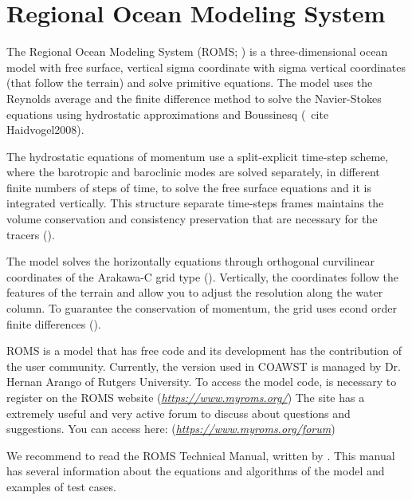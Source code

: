 
\section{Regional Ocean Modeling System}\label{romssecao}
\bigskip
\noindent The Regional Ocean Modeling System (ROMS; \cite{Shchepetkin2005}) is a three-dimensional ocean model with free surface, vertical sigma coordinate 
with sigma vertical coordinates (that follow the terrain) and solve primitive equations. The model uses the Reynolds average and the finite difference method to 
solve the Navier-Stokes equations using hydrostatic approximations and Boussinesq (\ cite {Haidvogel2008}).
\bigskip

\noindent The hydrostatic equations of momentum use a split-explicit time-step scheme, where the barotropic and baroclinic modes are solved separately, in
different finite numbers of steps of time, to solve the free surface equations and it is integrated vertically. This structure separate time-steps frames maintains 
the volume conservation and consistency preservation that are necessary for the tracers (\cite{Shchepetkin2005, Haidvogel2008}).
\bigskip

\noindent The model solves the horizontally equations through orthogonal curvilinear coordinates of the Arakawa-C grid type (\cite{Arakawa1977}). Vertically, the 
coordinates follow the features of the terrain and allow you to adjust the resolution along the water column. To guarantee the conservation of momentum, the grid uses
econd order finite differences (\cite{Haidvogel2008}).
\bigskip

\noindent ROMS is a model that has free code and its development has the contribution of the user community. Currently, the version used in COAWST is managed by Dr.
Hernan Arango of Rutgers University. To access the model code, is necessary to register on the ROMS website (\textcolor{bleu_cite}{\href{https://www.myroms.org/}{\textit{https://www.myroms.org/}}})
The site has a extremely useful and very active forum to discuss about questions and suggestions. You can access here:
(\textcolor{bleu_cite}{\href{https://www.myroms.org/forum}{\textit{https://www.myroms.org/forum}}})
\bigskip

\noindent We recommend to read the ROMS Technical Manual, written by \textcite{hedstrom2018}. This manual has several
information about the equations and algorithms of the model and examples of test cases.

